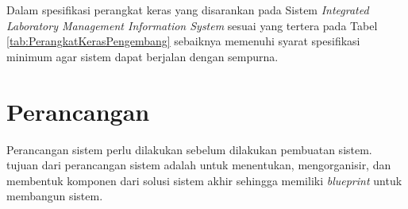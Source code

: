 \begin{enumerate}
	      Dalam spesifikasi perangkat keras yang disarankan pada Sistem \textit{Integrated Laboratory Management Information System} sesuai yang tertera pada Tabel \ref{tab:PerangkatKerasPengembang} sebaiknya memenuhi syarat spesifikasi minimum agar sistem dapat berjalan dengan sempurna.

\end{enumerate}

\section{Perancangan}
Perancangan sistem perlu dilakukan sebelum dilakukan pembuatan sistem. tujuan dari perancangan sistem adalah untuk menentukan, mengorganisir, dan membentuk komponen dari solusi sistem akhir sehingga memiliki \textit{blueprint} untuk membangun sistem.

